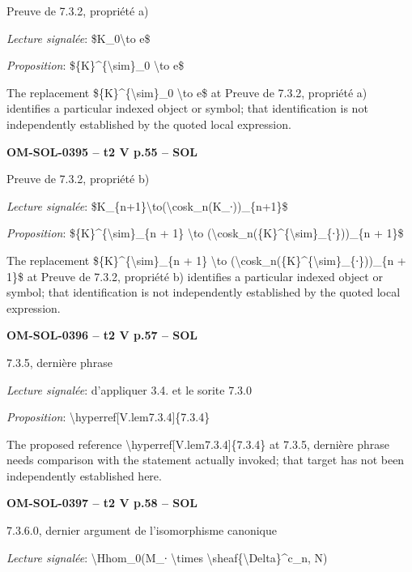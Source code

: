 Preuve de 7.3.2, propriété a)\par
\emph{Lecture signalée}: \$K\_0\textbackslash{}to e\$\par
\emph{Proposition}: \$\{K\}\textasciicircum{}\{\textbackslash{}sim\}\_0 \textbackslash{}to e\$\par
The replacement \$\{K\}\textasciicircum{}\{\textbackslash{}sim\}\_0 \textbackslash{}to e\$ at Preuve de 7.3.2, propriété a) identifies a particular indexed object or symbol; that identification is not independently established by the quoted local expression.\par
\par\noindent\textbf{OM-SOL-0395 -- t2 V p.55 -- SOL}\par
Preuve de 7.3.2, propriété b)\par
\emph{Lecture signalée}: \$K\_\{n+1\}\textbackslash{}to(\textbackslash{}cosk\_n(K\_∙))\_\{n+1\}\$\par
\emph{Proposition}: \$\{K\}\textasciicircum{}\{\textbackslash{}sim\}\_\{n + 1\} \textbackslash{}to (\textbackslash{}cosk\_n(\{K\}\textasciicircum{}\{\textbackslash{}sim\}\_\{∙\}))\_\{n + 1\}\$\par
The replacement \$\{K\}\textasciicircum{}\{\textbackslash{}sim\}\_\{n + 1\} \textbackslash{}to (\textbackslash{}cosk\_n(\{K\}\textasciicircum{}\{\textbackslash{}sim\}\_\{∙\}))\_\{n + 1\}\$ at Preuve de 7.3.2, propriété b) identifies a particular indexed object or symbol; that identification is not independently established by the quoted local expression.\par
\par\noindent\textbf{OM-SOL-0396 -- t2 V p.57 -- SOL}\par
7.3.5, dernière phrase\par
\emph{Lecture signalée}: d'appliquer 3.4. et le sorite 7.3.0\par
\emph{Proposition}: \textbackslash{}hyperref[V.lem7.3.4]\{7.3.4\}\par
The proposed reference \textbackslash{}hyperref[V.lem7.3.4]\{7.3.4\} at 7.3.5, dernière phrase needs comparison with the statement actually invoked; that target has not been independently established here.\par
\par\noindent\textbf{OM-SOL-0397 -- t2 V p.58 -- SOL}\par
7.3.6.0, dernier argument de l'isomorphisme canonique\par
\emph{Lecture signalée}: \textbackslash{}Hhom\_0(M\_∙ \textbackslash{}times \textbackslash{}sheaf\{\textbackslash{}Delta\}\textasciicircum{}c\_n, N)\par
